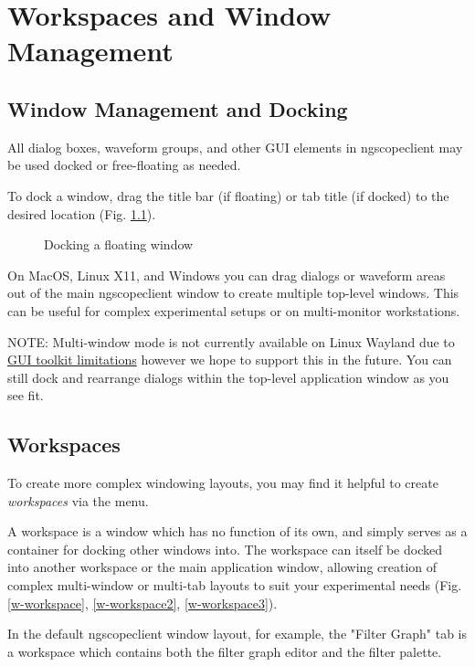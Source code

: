 \chapter{Workspaces and Window Management}

\section{Window Management and Docking}

All dialog boxes, waveform groups, and other GUI elements in ngscopeclient may be used docked or free-floating as
needed.

To dock a window, drag the title bar (if floating) or tab title (if docked) to the desired location (Fig.
\ref{w-docking}).

\begin{figure}[h]
\centering
{}
\caption{Docking a floating window}
\label{w-docking}
\end{figure}

On MacOS, Linux X11, and Windows you can drag dialogs or waveform areas out of the main ngscopeclient window to create
multiple top-level windows. This can be useful for complex experimental setups or on multi-monitor workstations.

NOTE: Multi-window mode is not currently available on Linux Wayland due to
\href{https://github.com/ocornut/imgui/issues/8609}{GUI toolkit limitations} however we hope to support this in the
future. You can still dock and rearrange dialogs within the top-level application window as you see fit.

\section{Workspaces}

To create more complex windowing layouts, you may find it helpful to create \emph{workspaces} via the
 menu.

A workspace is a window which has no function of its own, and simply serves as a container for docking other windows
into. The workspace can itself be docked into another workspace or the main application window, allowing creation of
complex multi-window or multi-tab layouts to suit your experimental needs (Fig. \ref{w-workspace}, \ref{w-workspace2},
\ref{w-workspace3}).

In the default ngscopeclient window layout, for example, the "Filter Graph" tab is a workspace which contains both the
filter graph editor and the filter palette.

